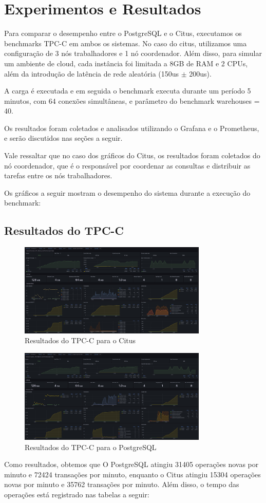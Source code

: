 \section{Experimentos e Resultados}

Para comparar o desempenho entre o PostgreSQL e o Citus, executamos os benchmarks TPC-C em ambos os sistemas.
No caso do citus, utilizamos uma configuração de 3 nós trabalhadores e 1 nó coordenador. Além disso, para simular um ambiente de cloud, cada instância foi limitada a 8GB de RAM e 2 CPUs,
além da introdução de latência de rede aleatória (150us $\pm$ 200us). 

A carga é executada e em seguida o benchmark executa durante um período 5 minutos, 
com 64 conexões simultâneas, e parâmetro do benchmark warehouses = 40.

Os resultados foram coletados e analisados utilizando o Grafana e o Prometheus,
e serão discutidos nas seções a seguir.

Vale ressaltar que no caso dos gráficos do Citus, os resultados foram coletados do nó coordenador,
que é o responsável por coordenar as consultas e distribuir as tarefas entre os nós trabalhadores. 

Os gráficos a seguir mostram o desempenho do sistema durante a execução do benchmark:
\subsection{Resultados do TPC-C}
\begin{figure}[H]
	\centering
	\includegraphics[width=0.8\textwidth]{imgs/citus.jpg}
	\caption{Resultados do TPC-C para o Citus}
	\label{fig:tpc-c}
\end{figure}

\begin{figure}[H]
	\centering
	\includegraphics[width=0.8\textwidth]{imgs/Postgres.jpg}
	\caption{Resultados do TPC-C para o PostgreSQL}
	\label{fig:tpc-c}
\end{figure}

Como resultados, obtemos que O PostgreSQL atingiu 31405 operações novas por minuto e 72424 transações por minuto, 
enquanto o Citus atingiu 15304 operações novas por minuto e 35762 transações por minuto.
Além disso, o tempo das operações está registrado nas tabelas a seguir:

